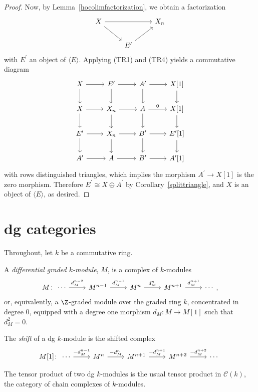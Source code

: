 \documentclass[10pt]{amsart}
\begin{document}
\begin{prop}
\begin{proof}
    Now, by Lemma~\ref{hocolimfactorization}, we obtain a factorization
    $$\begin{tikzcd}
      X \arrow{rr}\arrow{rd} & & X_n\\
      & E^\prime \arrow{ur}
    \end{tikzcd}$$
    with $E^\prime$ an object of $\langle E \rangle$.
    Applying (TR1) and (TR4) yields a commutative diagram
    $$\begin{tikzcd}
      X \arrow{d}\arrow{r} & E^\prime \arrow{r}\arrow{d} & A^\prime \arrow{r}\arrow{d} & X[1]\arrow{d}\\
      X \arrow{r}\arrow{d} & X_n \arrow{r}\arrow{d} & A \arrow{r}{0}\arrow{d} & X[1]\arrow{d}\\
      E^\prime \arrow{r}\arrow{d} & X_n \arrow{r}\arrow{d} & B^\prime \arrow{r}\arrow{d} & E^\prime[1]\arrow{d}\\
      A^\prime \arrow{r} & A \arrow{r} & B^\prime \arrow{r} & A^\prime[1]
    \end{tikzcd}$$
    with rows distinguished triangles, which implies the morphism $A^\prime \rightarrow X[1]$ is the zero morphism.
    Therefore $E^\prime \cong X \oplus A^\prime$ by Corollary~\ref{splittriangle}, and $X$ is an object of $\langle E \rangle$, as desired.
  \end{proof}
\end{prop}

\section{dg categories}
Throughout, let $k$ be a commutative ring.

\begin{defn}
  A {\it differential graded $k$-module}, $M$, is a complex of $k$-modules
  $$M \colon \begin{tikzcd}
    \cdots \arrow{r}{d_M^{n-2}} & M^{n-1} \arrow{r}{d_M^{n-1}} & M^n \arrow{r}{d_M^n} & M^{n+1} \arrow{r}{d_M^{n+1}} & \cdots
  \end{tikzcd},$$
  or, equivalently, a $\Z$-graded module over the graded ring $k$, concentrated in degree 0, equipped with a degree one morphism $d_M : M \rightarrow M[1]$ such that $d_M^2 = 0$.
  
  The {\it shift} of a dg $k$-module is the shifted complex
  $$M[1] \colon \begin{tikzcd}
    \cdots \arrow{r}{-d_M^{n-1}} & M^{n} \arrow{r}{-d_M^{n}} & M^{n+1} \arrow{r}{-d_M^{n+1}} & M^{n+2} \arrow{r}{-d_M^{n+2}} & \cdots
  \end{tikzcd}$$
  
  The tensor product of two dg $k$-modules is the usual tensor product in $\mathcal{C}(k)$, the category of chain complexes of $k$-modules.
\end{defn}
\end{document}
